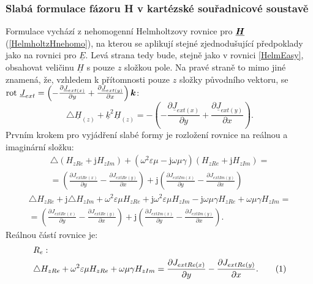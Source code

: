 \documentclass[12pt,a4paper,oneside]{article}
\numberwithin{equation}{section} %
\numberwithin{figure}{section} %
\numberwithin{table}{section} %
\newcommand{\mj}{\mathrm{j}} %
\renewcommand{\vec}[1]{\mbox{\boldmath$#1$}} %
\newcommand{\faz}[1]{{\underline{#1}}} %
\newcommand{\rot}{\mathrm{rot}\ }
\newcommand\numberthis{\addtocounter{equation}{1}\tag{\theequation}}
\begin{document}
\subsubsection{Slabá formulace fázoru H v kartézské souřadnicové soustavě}
Formulace vychází z nehomogenní Helmholtzovy rovnice pro $\faz{\vec{H}}$ (\ref{HelmholtzHnehomo}), na kterou se aplikují stejné zjednodušující předpoklady jako na rovnici pro $\faz{E}$. Levá strana tedy bude, stejně jako v rovnici \ref{HelmEasy}, obsahovat veličinu $\faz{H}$ s pouze $z$ složkou pole. Na pravé straně to mimo jiné znamená, že, vzhledem k přítomnosti pouze $z$ složky původního vektoru, se $\rot \faz{J} _{ext} = \left( - \frac{\partial \faz{J} _{ext(x)}}{\partial y} + \frac{\partial \faz{J} _{ext(y)}}{\partial x} \right) \vec{k}$:
\begin{equation}
\label{HelmEasyH}
\triangle \faz{H} _{(z)} + \faz{k} ^2 \faz{H} _{(z)} = - \left( - \frac{\partial \faz{J} _{ext(x)}}{\partial y} + \frac{\partial \faz{J} _{ext(y)}}{\partial x} \right) .
\end{equation}
Prvním krokem pro vyjádření slabé formy je rozložení rovnice na reálnou a imaginární složku:
\begin{equation}
\begin{split}
\triangle (H _{zRe} + \mj H _{zIm}) + (\omega ^2 \varepsilon \mu - \mj \omega \mu \gamma) (H _{zRe} + \mj H _{zIm}) =\\ 
= \left( \frac{\partial J _{extRe(x)}}{\partial y} - \frac{\partial J _{extRe(y)}}{\partial x} \right) + \mj \left( \frac{\partial J _{extIm(x)}}{\partial y} - \frac{\partial J _{extIm(y)}}{\partial x} \right)
\end{split}
\end{equation}
\begin{equation}
\begin{split}
\triangle H _{zRe} + \mj \triangle H _{zIm} + \omega ^2 \varepsilon \mu H_ {zRe} + \mj \omega ^2 \varepsilon \mu H _{zIm} - \mj \omega \mu \gamma H _{zRe} + \omega \mu \gamma H _{zIm} =\\
= \left( \frac{\partial J _{extRe(x)}}{\partial y} - \frac{\partial J _{extRe(y)}}{\partial x} \right) + \mj \left( \frac{\partial J _{extIm(x)}}{\partial y} - \frac{\partial J _{extIm(y)}}{\partial x} \right) .
\end{split}
\end{equation}
Reálnou částí rovnice je:
\begin{align*}
&R_{e}:
\\
&\triangle H_ {zRe} + \omega ^2 \varepsilon \mu H_ {zRe} + \omega \mu \gamma H _{zIm} = \frac{\partial J _{extRe(x)}}{\partial y} - \frac{\partial J _{extRe(y)}}{\partial x} .
\numberthis
\end{align*}
\end{document}
